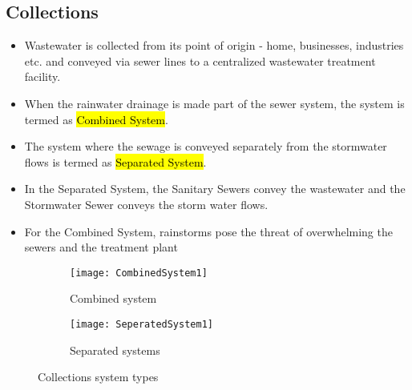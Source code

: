 \subsection{Collections}

\begin{itemize}
\item Wastewater is collected from its point of origin - home, businesses, industries etc. and conveyed via sewer lines to a centralized wastewater treatment facility.  
\item When the rainwater drainage is made part of the sewer system, the system is termed as \hl{Combined System}.  
\item The system where the sewage is conveyed separately from the stormwater flows is termed as \hl{Separated System}.  
\item In the Separated System, the Sanitary Sewers convey the wastewater and the Stormwater Sewer conveys the storm water flows.  
\item For the Combined System, rainstorms pose the threat of overwhelming the sewers and the treatment plant
\end{itemize}


%
%
%	
%
%
%


	\begin{figure}[h!]
	\centering
  \begin{subfigure}[b]{0.47\linewidth}
  
 \begin{center} 
    \texttt{[image: CombinedSystem1]}
    \caption{Combined system}
    \end{center} 
  \end{subfigure}
    \begin{subfigure}[b]{0.50\linewidth}
  \begin{center} 
    \texttt{[image: SeperatedSystem1]}
    \caption{Separated systems}
    \end{center} 
  \end{subfigure}
  

  
  \caption{Collections system types}

  \end{figure}



